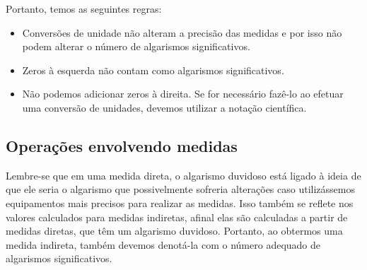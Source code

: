 Portanto, temos as seguintes regras:
\begin{itemize}
	\item Conversões de unidade não alteram a precisão das medidas e por isso não podem alterar o número de algarismos significativos.
	\item Zeros à esquerda não contam como algarismos significativos.
	\item Não podemos adicionar zeros à direita. Se for necessário fazê-lo ao efetuar uma conversão de unidades, devemos utilizar a notação científica.
\end{itemize}

\subsection{Operações envolvendo medidas}

Lembre-se que em uma medida direta, o algarismo duvidoso está ligado à ideia de que ele seria o algarismo que possivelmente sofreria alterações caso utilizássemos equipamentos mais precisos para realizar as medidas. Isso também se reflete nos valores calculados para medidas indiretas, afinal elas são calculadas a partir de medidas diretas, que têm um algarismo duvidoso. Portanto, ao obtermos uma medida indireta, também devemos denotá-la com o número adequado de algarismos significativos.

